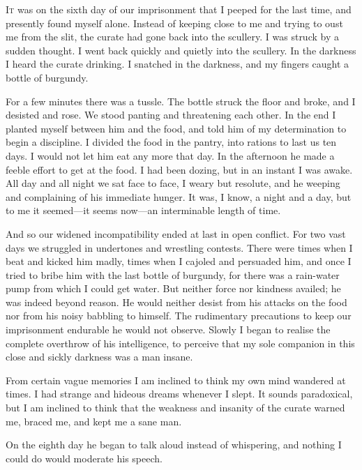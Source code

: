

\lettrine[lines=4]{I}{t} was on the sixth day of our imprisonment that I peeped for the last time, and presently found myself alone. Instead of keeping close to me and trying to oust me from the slit, the curate had gone back into the scullery. I was struck by a sudden thought. I went back quickly and quietly into the scullery. In the darkness I heard the curate drinking. I snatched in the darkness, and my fingers caught a bottle of burgundy.

For a few minutes there was a tussle. The bottle struck the floor and broke, and I desisted and rose. We stood panting and threatening each other. In the end I planted myself between him and the food, and told him of my determination to begin a discipline. I divided the food in the pantry, into rations to last us ten days. I would not let him eat any more that day. In the afternoon he made a feeble effort to get at the food. I had been dozing, but in an instant I was awake. All day and all night we sat face to face, I weary but resolute, and he weeping and complaining of his immediate hunger. It was, I know, a night and a day, but to me it seemed—it seems now—an interminable length of time.

And so our widened incompatibility ended at last in open conflict. For two vast days we struggled in undertones and wrestling contests. There were times when I beat and kicked him madly, times when I cajoled and persuaded him, and once I tried to bribe him with the last bottle of burgundy, for there was a rain-water pump from which I could get water. But neither force nor kindness availed; he was indeed beyond reason. He would neither desist from his attacks on the food nor from his noisy babbling to himself. The rudimentary precautions to keep our imprisonment endurable he would not observe. Slowly I began to realise the complete overthrow of his intelligence, to perceive that my sole companion in this close and sickly darkness was a man insane.

From certain vague memories I am inclined to think my own mind wandered at times. I had strange and hideous dreams whenever I slept. It sounds paradoxical, but I am inclined to think that the weakness and insanity of the curate warned me, braced me, and kept me a sane man.

On the eighth day he began to talk aloud instead of whispering, and nothing I could do would moderate his speech.

